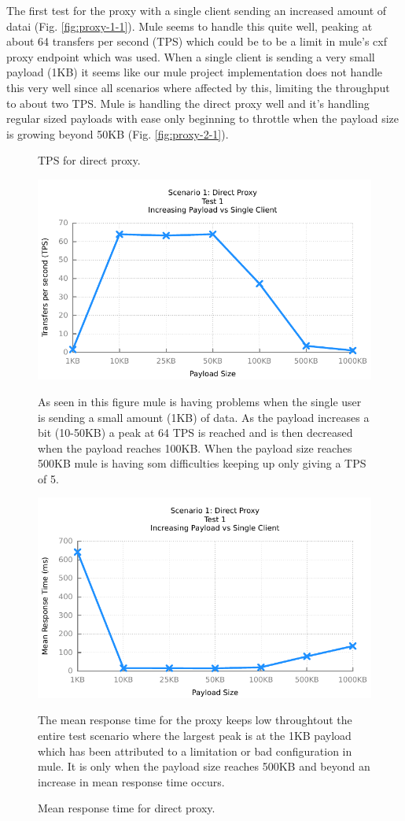 The first test for the proxy with a single client sending an increased amount of datai (Fig. \ref{fig:proxy-1-1}). Mule seems to handle this quite well, peaking at about 64 transfers per second (TPS) which could be to be a limit in mule's cxf proxy endpoint which was used. When a single client is sending a very small payload (1KB) it seems like our mule project implementation does not handle this very well since all scenarios where affected by this, limiting the throughput to about two TPS. Mule is handling the direct proxy well and it's handling regular sized payloads with ease only beginning to throttle when the payload size is growing beyond 50KB (Fig. \ref{fig:proxy-2-1}).

\newpage
\begin{figure}[H]
	\caption{TPS for direct proxy.}
	\centerline{\includegraphics{img/proxy_fu_ip_tps}}
	\label{fig:proxy-1-1}
	As seen in this figure mule is having problems when the single user is sending a small amount (1KB) of data. 
	As the payload increases a bit (10-50KB) a peak at 64 TPS is reached and is then decreased when the payload reaches 100KB.
	When the payload size reaches 500KB mule is having som difficulties keeping up only giving a TPS of 5.

	\caption{Mean response time for direct proxy.}
	\centerline{\includegraphics{img/proxy_fu_ip_resp}}
	\label{fig:proxy-1-2}
	The mean response time for the proxy keeps low throughtout the entire test scenario where the largest peak is at the 1KB payload which has been attributed to a limitation or bad configuration in mule.
	It is only when the payload size reaches 500KB and beyond an increase in mean response time occurs.
\end{figure}

